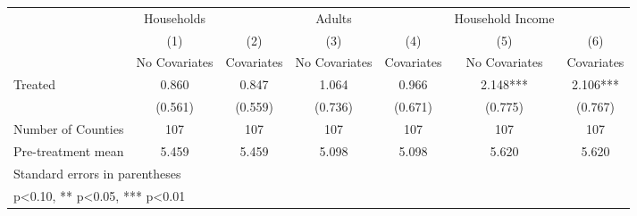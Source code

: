 {
\def\sym#1{\ifmmode^{#1}\else\(^{#1}\)\fi}
\begin{tabular}{l*{6}{c}}
\hline\hline
            &  Households   &               &      Adults   &               &Household Income   &               \\
            &\multicolumn{1}{c}{(1)}&\multicolumn{1}{c}{(2)}&\multicolumn{1}{c}{(3)}&\multicolumn{1}{c}{(4)}&\multicolumn{1}{c}{(5)}&\multicolumn{1}{c}{(6)}\\
            &\multicolumn{1}{c}{No Covariates}&\multicolumn{1}{c}{Covariates}&\multicolumn{1}{c}{No Covariates}&\multicolumn{1}{c}{Covariates}&\multicolumn{1}{c}{No Covariates}&\multicolumn{1}{c}{Covariates}\\
\hline
Treated     &       0.860   &       0.847   &       1.064   &       0.966   &       2.148***&       2.106***\\
            &     (0.561)   &     (0.559)   &     (0.736)   &     (0.671)   &     (0.775)   &     (0.767)   \\
\hline
Number of Counties&         107   &         107   &         107   &         107   &         107   &         107   \\
Pre-treatment mean&       5.459   &       5.459   &       5.098   &       5.098   &       5.620   &       5.620   \\
\hline\hline
\multicolumn{7}{l}{\footnotesize Standard errors in parentheses}\\
\multicolumn{7}{l}{\footnotesize * p<0.10, ** p<0.05, *** p<0.01}\\
\end{tabular}
}
